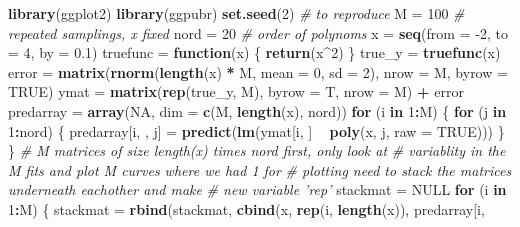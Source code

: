 \documentclass[]{article}
\newenvironment{Shaded}{\begin{snugshade}}{\end{snugshade}}
\newcommand{\CommentTok}[1]{\textcolor[rgb]{0.56,0.35,0.01}{\textit{#1}}}
\newcommand{\ControlFlowTok}[1]{\textcolor[rgb]{0.13,0.29,0.53}{\textbf{#1}}}
\newcommand{\DataTypeTok}[1]{\textcolor[rgb]{0.13,0.29,0.53}{#1}}
\newcommand{\DecValTok}[1]{\textcolor[rgb]{0.00,0.00,0.81}{#1}}
\newcommand{\FloatTok}[1]{\textcolor[rgb]{0.00,0.00,0.81}{#1}}
\newcommand{\KeywordTok}[1]{\textcolor[rgb]{0.13,0.29,0.53}{\textbf{#1}}}
\newcommand{\NormalTok}[1]{#1}
\newcommand{\OperatorTok}[1]{\textcolor[rgb]{0.81,0.36,0.00}{\textbf{#1}}}
\newcommand{\OtherTok}[1]{\textcolor[rgb]{0.56,0.35,0.01}{#1}}
\newcommand{\StringTok}[1]{\textcolor[rgb]{0.31,0.60,0.02}{#1}}
\begin{document}
\begin{Shaded}
\begin{Highlighting}[]
\KeywordTok{library}\NormalTok{(ggplot2)}
\KeywordTok{library}\NormalTok{(ggpubr)}
\KeywordTok{set.seed}\NormalTok{(}\DecValTok{2}\NormalTok{)  }\CommentTok{# to reproduce}
\NormalTok{M =}\StringTok{ }\DecValTok{100}  \CommentTok{# repeated samplings, x fixed }
\NormalTok{nord =}\StringTok{ }\DecValTok{20}  \CommentTok{# order of polynoms}
\NormalTok{x =}\StringTok{ }\KeywordTok{seq}\NormalTok{(}\DataTypeTok{from =} \DecValTok{-2}\NormalTok{, }\DataTypeTok{to =} \DecValTok{4}\NormalTok{, }\DataTypeTok{by =} \FloatTok{0.1}\NormalTok{)}
\NormalTok{truefunc =}\StringTok{ }\ControlFlowTok{function}\NormalTok{(x) \{}
    \KeywordTok{return}\NormalTok{(x}\OperatorTok{^}\DecValTok{2}\NormalTok{)}
\NormalTok{\}}
\NormalTok{true_y =}\StringTok{ }\KeywordTok{truefunc}\NormalTok{(x)}
\NormalTok{error =}\StringTok{ }\KeywordTok{matrix}\NormalTok{(}\KeywordTok{rnorm}\NormalTok{(}\KeywordTok{length}\NormalTok{(x) }\OperatorTok{*}\StringTok{ }\NormalTok{M, }\DataTypeTok{mean =} \DecValTok{0}\NormalTok{, }\DataTypeTok{sd =} \DecValTok{2}\NormalTok{), }\DataTypeTok{nrow =}\NormalTok{ M, }\DataTypeTok{byrow =} \OtherTok{TRUE}\NormalTok{)}
\NormalTok{ymat =}\StringTok{ }\KeywordTok{matrix}\NormalTok{(}\KeywordTok{rep}\NormalTok{(true_y, M), }\DataTypeTok{byrow =}\NormalTok{ T, }\DataTypeTok{nrow =}\NormalTok{ M) }\OperatorTok{+}\StringTok{ }\NormalTok{error}
\NormalTok{predarray =}\StringTok{ }\KeywordTok{array}\NormalTok{(}\OtherTok{NA}\NormalTok{, }\DataTypeTok{dim =} \KeywordTok{c}\NormalTok{(M, }\KeywordTok{length}\NormalTok{(x), nord))}
\ControlFlowTok{for}\NormalTok{ (i }\ControlFlowTok{in} \DecValTok{1}\OperatorTok{:}\NormalTok{M) \{}
    \ControlFlowTok{for}\NormalTok{ (j }\ControlFlowTok{in} \DecValTok{1}\OperatorTok{:}\NormalTok{nord) \{}
\NormalTok{        predarray[i, , j] =}\StringTok{ }\KeywordTok{predict}\NormalTok{(}\KeywordTok{lm}\NormalTok{(ymat[i, ] }\OperatorTok{~}\StringTok{ }\KeywordTok{poly}\NormalTok{(x, j, }\DataTypeTok{raw =} \OtherTok{TRUE}\NormalTok{)))}
\NormalTok{    \}}
\NormalTok{\}}
\CommentTok{# M matrices of size length(x) times nord first, only look at}
\CommentTok{# variablity in the M fits and plot M curves where we had 1 for}
\CommentTok{# plotting need to stack the matrices underneath eachother and make}
\CommentTok{# new variable 'rep'}
\NormalTok{stackmat =}\StringTok{ }\OtherTok{NULL}
\ControlFlowTok{for}\NormalTok{ (i }\ControlFlowTok{in} \DecValTok{1}\OperatorTok{:}\NormalTok{M) \{}
\NormalTok{    stackmat =}\StringTok{ }\KeywordTok{rbind}\NormalTok{(stackmat, }\KeywordTok{cbind}\NormalTok{(x, }\KeywordTok{rep}\NormalTok{(i, }\KeywordTok{length}\NormalTok{(x)), predarray[i, }

\end{Highlighting}
\end{Shaded}
\end{document}
